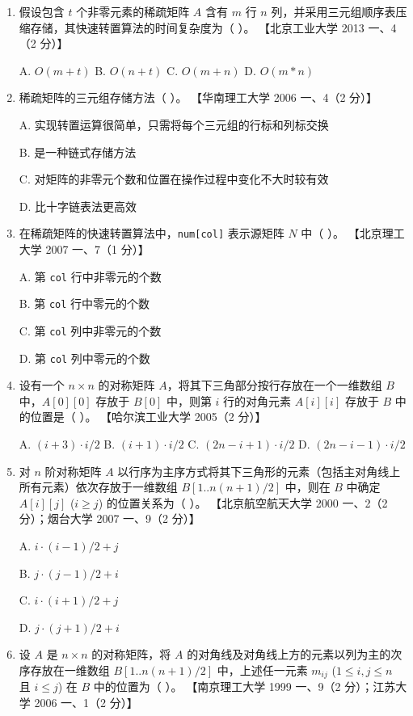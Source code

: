 \documentclass[lang=cn,newtx,10pt,scheme=chinese]{elegantbook}
\begin{document}
\begin{enumerate}
    \item 假设包含 $t$ 个非零元素的稀疏矩阵 $A$ 含有 $m$ 行 $n$ 列，并采用三元组顺序表压缩存储，其快速转置算法的时间复杂度为（ ）。  
    【北京工业大学 2013 一、4（2 分）】

    A. $O(m+t)$ \quad B. $O(n+t)$ \quad C. $O(m+n)$ \quad D. $O(m*n)$  

    \item 稀疏矩阵的三元组存储方法（ ）。  
    【华南理工大学 2006 一、4（2 分）】  

    A. 实现转置运算很简单，只需将每个三元组的行标和列标交换  

    B. 是一种链式存储方法  

    C. 对矩阵的非零元个数和位置在操作过程中变化不大时较有效  

    D. 比十字链表法更高效  

    \item 在稀疏矩阵的快速转置算法中，\texttt{num[col]} 表示源矩阵 $N$ 中（ ）。  
    【北京理工大学 2007 一、7（1 分）】  

    A. 第 \texttt{col} 行中非零元的个数  

    B. 第 \texttt{col} 行中零元的个数  

    C. 第 \texttt{col} 列中非零元的个数  

    D. 第 \texttt{col} 列中零元的个数  

    \item 设有一个 $n \times n$ 的对称矩阵 $A$，将其下三角部分按行存放在一个一维数组 $B$ 中，$A[0][0]$ 存放于 $B[0]$ 中，则第 $i$ 行的对角元素 $A[i][i]$ 存放于 $B$ 中的位置是（ ）。  
    【哈尔滨工业大学 2005（2 分）】  

    A. $(i+3) \cdot i / 2$ \quad B. $(i+1) \cdot i / 2$ \quad C. $(2n-i+1) \cdot i / 2$ \quad D. $(2n-i-1) \cdot i / 2$  

    \item 对 $n$ 阶对称矩阵 $A$ 以行序为主序方式将其下三角形的元素（包括主对角线上所有元素）依次存放于一维数组 $B[1..n(n+1)/2]$ 中，则在 $B$ 中确定 $A[i][j]$ ($i \geq j$) 的位置关系为（ ）。  
    【北京航空航天大学 2000 一、2（2 分）；烟台大学 2007 一、9（2 分）】  

    A. $i \cdot (i-1)/2 + j$  

    B. $j \cdot (j-1)/2 + i$  

    C. $i \cdot (i+1)/2 + j$  

    D. $j \cdot (j+1)/2 + i$  

    \item 设 $A$ 是 $n \times n$ 的对称矩阵，将 $A$ 的对角线及对角线上方的元素以列为主的次序存放在一维数组 $B[1..n(n+1)/2]$ 中，上述任一元素 $m_{ij}$ ($1 \leq i, j \leq n$ 且 $i \leq j$) 在 $B$ 中的位置为（ ）。  
    【南京理工大学 1999 一、9（2 分）；江苏大学 2006 一、1（2 分）】 


\end{enumerate}
\end{document}
